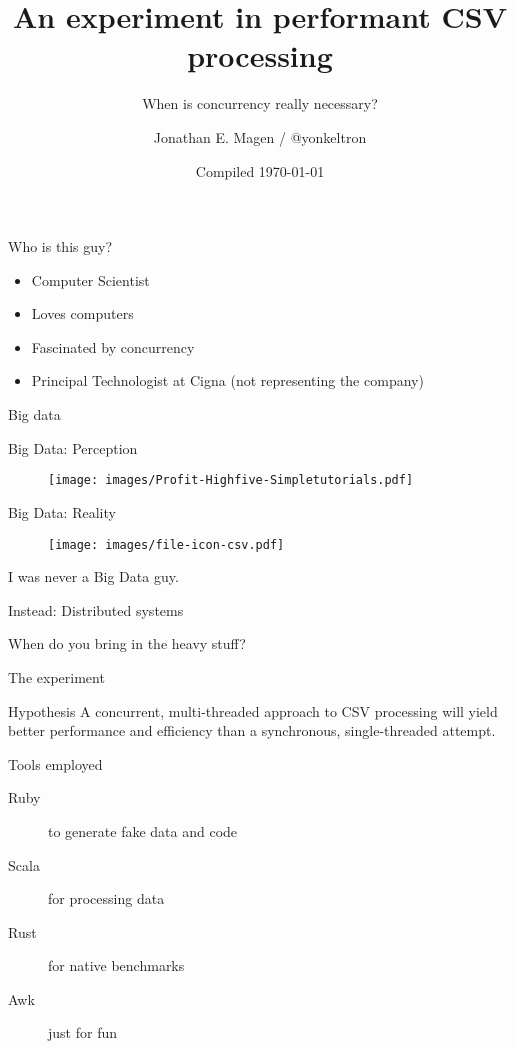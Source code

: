 \documentclass[aspectratio=169,14pt]{beamer}
\title{An experiment in performant CSV processing}
\subtitle{When is concurrency really necessary?}
\author{Jonathan E. Magen / \faicon{twitter} @yonkeltron}
\date{Compiled \today}
\newcommand{\megatext}[1]{
  \begin{center}
    \Huge
    #1
  \end{center}
}
\newcommand{\bigtext}[1]{
  \begin{center}
    \Large
    #1
  \end{center}
}
\begin{document}
\frame{\titlepage}

\begin{frame}{Who is this guy?}
  \begin{itemize}
  \item Computer Scientist
  \item Loves computers
  \item Fascinated by concurrency
  \item Principal Technologist at Cigna (not representing the company)
  \end{itemize}
\end{frame}


\begin{frame}
  \megatext{Big data}
\end{frame}

\begin{frame}{Big Data: Perception}
  \begin{figure}
    \texttt{[image: images/Profit-Highfive-Simpletutorials.pdf]}
  \end{figure}
\end{frame}

\begin{frame}{Big Data: Reality}
  \begin{figure}
    \texttt{[image: images/file-icon-csv.pdf]}
  \end{figure}
\end{frame}

\begin{frame}
  \megatext{I was never a Big Data guy.}
  \bigtext{Instead: Distributed systems}
\end{frame}

\begin{frame}
  \megatext{When do you bring in the heavy stuff?}
\end{frame}

\begin{frame}{The experiment}
  \begin{block}{Hypothesis}
    A concurrent, multi-threaded approach to CSV processing will yield better performance and efficiency than a synchronous, single-threaded attempt.
  \end{block}

  \begin{block}{Tools employed}
    \begin{description}
    \item[Ruby] to generate fake data and code
    \item[Scala] for processing data
    \item[Rust] for native benchmarks
    \item[Awk] just for fun
    \end{description}
  \end{block}
\end{frame}
\end{document}
